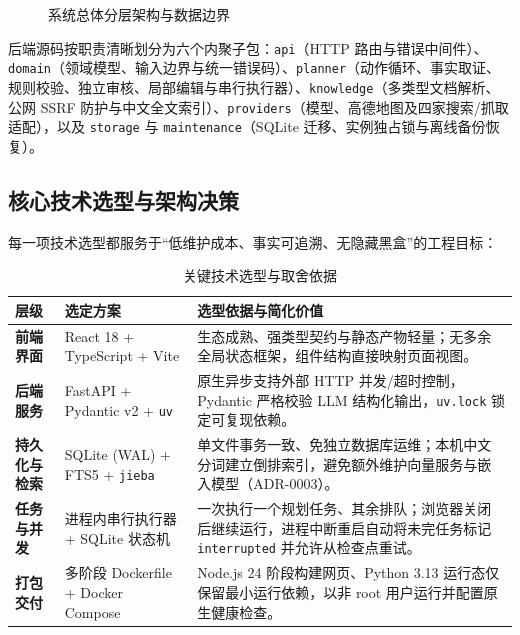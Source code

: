 \begin{figure}[H]
  \caption{系统总体分层架构与数据边界}
  \label{fig:system-arch}
\end{figure}

后端源码按职责清晰划分为六个内聚子包：\texttt{api}（HTTP 路由与错误中间件）、\texttt{domain}（领域模型、输入边界与统一错误码）、\texttt{planner}（动作循环、事实取证、规则校验、独立审核、局部编辑与串行执行器）、\texttt{knowledge}（多类型文档解析、公网 SSRF 防护与中文全文索引）、\texttt{providers}（模型、高德地图及四家搜索/抓取适配），以及 \texttt{storage} 与 \texttt{maintenance}（SQLite 迁移、实例独占锁与离线备份恢复）。

\subsection{核心技术选型与架构决策}

每一项技术选型都服务于“低维护成本、事实可追溯、无隐藏黑盒”的工程目标：

\begin{table}[H]
  \centering
  \caption{关键技术选型与取舍依据}
  \renewcommand{\arraystretch}{1.28}
  \begin{tabularx}{\textwidth}{@{} >{\sffamily\bfseries}p{2.6cm} >{\sffamily}p{3.4cm} Y @{}}
    \toprule
    层级 & 选定方案 & 选型依据与简化价值 \\
    \midrule
    前端界面 & React 18 + TypeScript + Vite & 生态成熟、强类型契约与静态产物轻量；无多余全局状态框架，组件结构直接映射页面视图。 \\
    后端服务 & FastAPI + Pydantic v2 + \texttt{uv} & 原生异步支持外部 HTTP 并发/超时控制，Pydantic 严格校验 LLM 结构化输出，\texttt{uv.lock} 锁定可复现依赖。 \\
    持久化与检索 & SQLite (WAL) + FTS5 + \texttt{jieba} & 单文件事务一致、免独立数据库运维；本机中文分词建立倒排索引，避免额外维护向量服务与嵌入模型（ADR-0003）。 \\
    任务与并发 & 进程内串行执行器 + SQLite 状态机 & 一次执行一个规划任务、其余排队；浏览器关闭后继续运行，进程中断重启自动将未完任务标记 \texttt{interrupted} 并允许从检查点重试。 \\
    打包交付 & 多阶段 Dockerfile + Docker Compose & Node.js 24 阶段构建网页、Python 3.13 运行态仅保留最小运行依赖，以非 root 用户运行并配置原生健康检查。 \\
    \bottomrule
  \end{tabularx}
\end{table}

